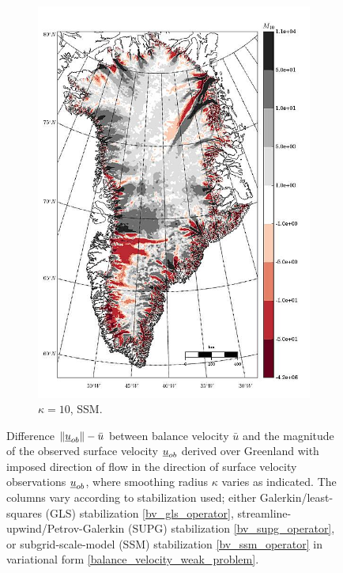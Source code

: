 \begin{figure}
\begin{subfigure}[b]{0.25\linewidth}
    \includegraphics[width=\linewidth]{images/balance_velocity/greenland/d_U_ob/misfit_5H_kappa_10_SSM.jpg}
  \caption{$\kappa = 10$, SSM.}
  \label{greenland_bv_image_d_U_ob_kappa_10_SSM_misfit}
  \end{subfigure}
 
  \caption[Greenland balance-velocity misfit with $\mathbf{d}^{\text{data}} = \mathbf{u}_{ob}$.]{Difference $\Vert \underline{u}_{ob} \Vert - \bar{u}$ between balance velocity $\bar{u}$ and the magnitude of the observed surface velocity $\underline{u}_{ob}$ derived over Greenland with imposed direction of flow in the direction of surface velocity observations $\underline{u}_{ob}$, where smoothing radius $\kappa$ varies as indicated.  The columns vary according to stabilization used; either Galerkin/least-squares (GLS) stabilization \cref{bv_gls_operator}, streamline-upwind/Petrov-Galerkin (SUPG) stabilization \cref{bv_supg_operator}, or subgrid-scale-model (SSM) stabilization \cref{bv_ssm_operator} in variational form \cref{balance_velocity_weak_problem}.}

  \label{greenland_bv_image_d_U_ob_misfit}

\end{figure}

